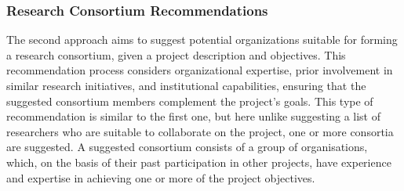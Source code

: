 \subsubsection*{Research Consortium Recommendations}
The second approach aims to suggest potential organizations suitable for forming a research consortium, given a project description and objectives.
This recommendation process considers organizational expertise, prior involvement in similar research initiatives, and institutional capabilities, ensuring that the suggested consortium members complement the project's goals.
This type of recommendation is similar to the first one, but here unlike suggesting a list of researchers who are suitable to collaborate on the project, one or more consortia are suggested.
A suggested consortium consists of a group of organisations, which, on the basis of their past participation in other projects, have experience and expertise in achieving one or more of the project objectives.